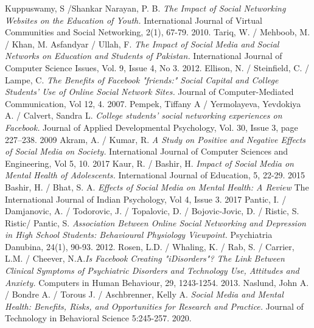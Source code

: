 \documentclass[lettersize,journal]{IEEEtran}
\begin{document}
\begin{thebibliography}{}
        Kuppuswamy, S /Shankar Narayan, P. B. {\it{The Impact of Social Networking Websites on the Education of Youth.}}
        International Journal of Virtual Communities and Social Networking, 2(1), 67-79.
        2010.
        Tariq, W. / Mehboob, M. / Khan, M. Asfandyar / Ullah, F. {\it{The Impact of Social Media and Social Networks on Education and Students of Pakistan.}} International Journal of Computer Science Issues, Vol. 9, Issue 4, No 3.
        2012.
        Ellison, N. / Steinfield, C. / Lampe, C. {\it{The Benefits of Facebook "friends:" Social Capital and College Students' Use of Online Social Network Sites.}} Journal of Computer-Mediated Communication, Vol 12, 4.
        2007.
        Pempek, Tiffany A / Yermolayeva, Yevdokiya A. / Calvert, Sandra L. {\it{College students’ social networking experiences on
                Facebook.}} Journal of Applied Developmental Psychology, Vol. 30, Issue 3, page 227–238.
        2009
        Akram, A. / Kumar, R. {\it{A Study on Positive and Negative Effects of Social Media on Society.}}
        International Journal of Computer Sciences and Engineering, Vol 5, 10.
        2017
        Kaur, R. / Bashir, H. {\it{Impact of Social Media on Mental Health of Adolescents.}}
        International Journal of Education, 5, 22-29.
        2015
        Bashir, H. / Bhat, S. A. {\it{Effects of Social Media on Mental Health: A Review}}
        The International Journal of Indian Psychology, Vol 4, Issue 3.
        2017
        Pantic, I. / Damjanovic, A. / Todorovic, J. / Topalovic, D. / Bojovic-Jovic, D. / Ristic, S. Ristic/ Pantic, S.
        {\it{Association Between Online Social Networking and Depression in High School Students: Behavioural Physiology Viewpoint.}}
        Psychiatria Danubina, 24(1), 90-93.
        2012.
        Rosen, L.D. / Whaling, K. / Rab, S. / Carrier, L.M. / Cheever, N.A.{\it{Is Facebook Creating "iDisorders"? The Link Between Clinical Symptoms of Psychiatric Disorders and Technology Use, Attitudes and Anxiety.}} Computers in Human Behaviour, 29, 1243-1254.
        2013.
        Naslund, John A. / Bondre A. / Torous J. / Aschbrenner, Kelly A. {\it{Social Media and Mental Health: Benefits, Risks, and Opportunities for Research and Practice.}} Journal of Technology in Behavioral Science 5:245-257.
        2020.

\end{thebibliography}
\end{document}

